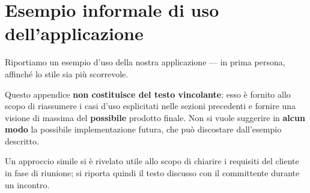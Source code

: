 \section{Esempio informale di uso dell'applicazione }


Riportiamo un esempio d'uso della nostra applicazione --- in prima persona, affinché lo stile sia più scorrevole.

Questo appendice \textbf{non costituisce del testo vincolante}: esso è fornito allo scopo di riassumere i casi d'uso esplicitati nelle sezioni precedenti e fornire una visione di massima del \textbf{possibile} prodotto finale. Non si vuole suggerire in \textbf{alcun modo} la possibile implementazione futura, che può discostare dall'esempio descritto.

Un approccio simile si è rivelato utile allo scopo di chiarire i requisiti del cliente in fase di riunione; si riporta quindi il testo discusso con il committente durante un incontro.

